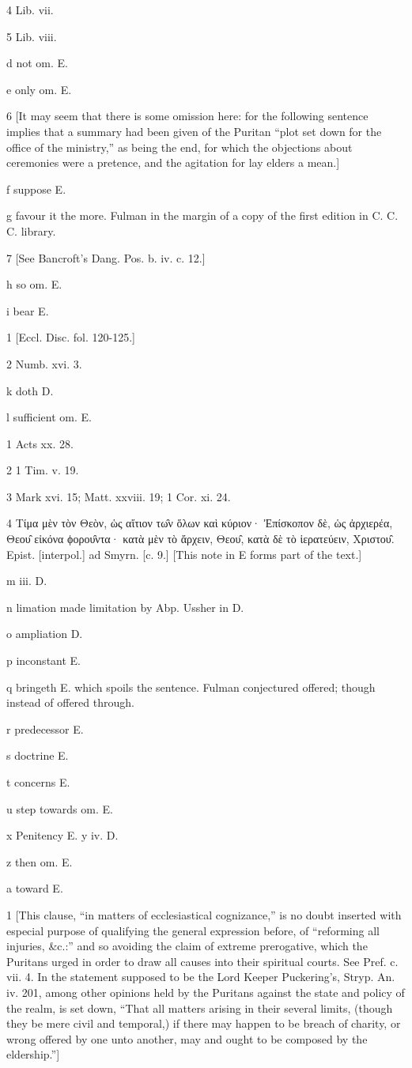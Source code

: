 4
Lib. vii.

5
Lib. viii.

d
not om. E.

e
only om. E.

6
[It may seem that there is some omission here: for the following sentence implies that a summary had been given of the Puritan “plot set down for the office of the ministry,” as being the end, for which the objections about ceremonies were a pretence, and the agitation for lay elders a mean.]

f
suppose E.

g
favour it the more. Fulman in the margin of a copy of the first edition in C. C. C. library.

7
[See Bancroft’s Dang. Pos. b. iv. c. 12.]

h
so om. E.

i
bear E.

1
[Eccl. Disc. fol. 120-125.]

2
Numb. xvi. 3.

k
doth D.

l
sufficient om. E.

1
Acts xx. 28.

2
1 Tim. v. 19.

3
Mark xvi. 15; Matt. xxviii. 19; 1 Cor. xi. 24.

4
Τίμα μὲν τὸν Θεὸν, ὡς αἴτιον τω̑ν ὅλων καὶ κύριον· Ἐπίσκοπον δὲ, ὡς ἀρχιερέα, Θεου̑ εἰκόνα ϕορου̑ντα· κατὰ μὲν τὸ ἄρχειν, Θεου̑, κατὰ δὲ τὸ ἱερατεύειν, Χριστου̑. Epist. [interpol.] ad Smyrn. [c. 9.] [This note in E forms part of the text.]

m
iii. D.

n
limation made limitation by Abp. Ussher in D.

o
ampliation D.

p
inconstant E.

q
bringeth E. which spoils the sentence. Fulman conjectured offered; though instead of offered through.

r
predecessor E.

s
doctrine E.

t
concerns E.

u
step towards om. E.

x Penitency E.
y
iv. D.

z
then om. E.

a
toward E.

1
[This clause, “in matters of ecclesiastical cognizance,” is no doubt inserted with especial purpose of qualifying the general expression before, of “reforming all injuries, &c.:” and so avoiding the claim of extreme prerogative, which the Puritans urged in order to draw all causes into their spiritual courts. See Pref. c. vii. 4. In the statement supposed to be the Lord Keeper Puckering’s, Stryp. An. iv. 201, among other opinions held by the Puritans against the state and policy of the realm, is set down, “That all matters arising in their several limits, (though they be mere civil and temporal,) if there may happen to be breach of charity, or wrong offered by one unto another, may and ought to be composed by the eldership.”]

